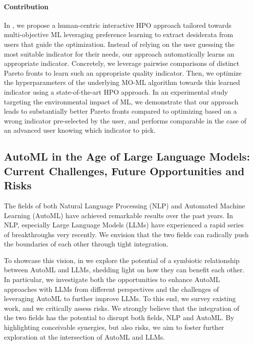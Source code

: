 \paragraph{Contribution} In , we propose a human-centric interactive HPO approach tailored towards multi-objective ML leveraging preference learning to extract desiderata from users that guide the optimization.
Instead of relying on the user guessing the most suitable indicator for their needs, our approach automatically learns an appropriate indicator.
Concretely, we leverage pairwise comparisons of distinct Pareto fronts to learn such an appropriate quality indicator.
Then, we optimize the hyperparameters of the underlying MO-ML algorithm towards this learned indicator using a state-of-the-art HPO approach.
In an experimental study targeting the environmental impact of ML, we demonstrate that our approach leads to substantially better Pareto fronts compared to optimizing based on a wrong indicator pre-selected by the user, and performs comparable in the case of an advanced user knowing which indicator to pick.


\subsection*{AutoML in the Age of Large Language Models: Current Challenges, Future Opportunities and Risks}

The fields of both Natural Language Processing (NLP) and Automated Machine Learning (AutoML) have achieved remarkable results over the past years.
In NLP, especially Large Language Models (LLMs) have experienced a rapid series of breakthroughs very recently.
We envision that the two fields can radically push the boundaries of each other through tight integration.

To showcase this vision, in  we explore the potential of a symbiotic relationship between AutoML and LLMs, shedding light on how they can benefit each other.
In particular, we investigate both the opportunities to enhance AutoML approaches with LLMs from different perspectives and the challenges of leveraging AutoML to further improve LLMs.
To this end, we survey existing work, and we critically assess risks.
We strongly believe that the integration of the two fields has the potential to disrupt both fields, NLP and AutoML.
By highlighting conceivable synergies, but also risks, we aim to foster further exploration at the intersection of AutoML and LLMs.


